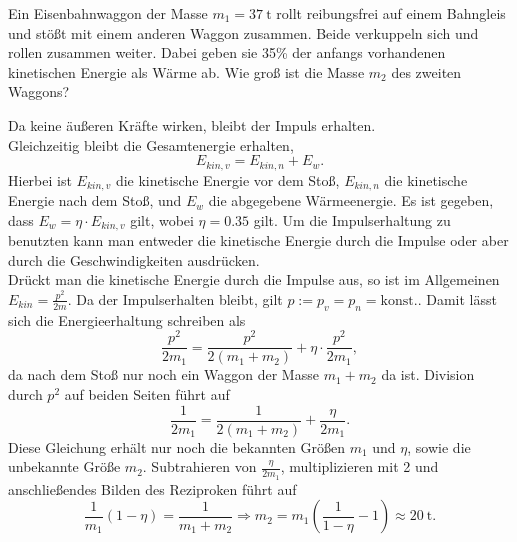 	\begin{Exercise}[label=ipho201741, title = Eisenbahnwaggon,difficulty={1},origin = {4. Runde IPhO 2017, Kurzaufgabe}]
 Ein Eisenbahnwaggon der Masse $m_1 = 37~\mathrm{t}$ rollt reibungsfrei auf einem Bahngleis und stößt mit einem anderen Waggon zusammen. Beide verkuppeln sich und rollen zusammen weiter. Dabei geben sie 35\% der anfangs vorhandenen kinetischen Energie als Wärme ab. Wie groß ist die Masse $m_2$ des zweiten Waggons?
	\end{Exercise}
\begin{Answer}[ref = ipho201741]
	Da keine äußeren Kräfte wirken, bleibt der Impuls erhalten.\\ Gleichzeitig bleibt die Gesamtenergie erhalten,
	\begin{equation}\label{energycons}
		E_{kin,v} = E_{kin,n}+E_{w}.
	\end{equation}
	Hierbei ist $E_{kin,v}$ die kinetische Energie vor dem Stoß, $E_{kin,n}$ die kinetische Energie nach dem Stoß, und $E_{w}$ die abgegebene Wärmeenergie. Es ist gegeben, dass $E_{w} = \eta \cdot E_{kin,v}$ gilt, wobei $\eta = 0.35$ gilt. Um die Impulserhaltung zu benutzten kann man entweder die kinetische Energie durch die Impulse oder aber durch die Geschwindigkeiten ausdrücken.\\
	Drückt man die kinetische Energie durch die Impulse aus, so ist im Allgemeinen $E_{kin} = \frac{p^2}{2m}$. Da der Impulserhalten bleibt, gilt $p:=p_v = p_n = \mathrm{konst.}$. Damit lässt sich die Energieerhaltung schreiben als
	\begin{equation}\label{penenergycons}
		\frac{p^2}{2m_1}= \frac{p^2}{2\left(m_1+m_2\right)} + \eta\cdot \frac{p^2}{2m_1},
	\end{equation}
	da nach dem Stoß nur noch ein \glqq Waggon\grqq{} der Masse $m_1+m_2$ da ist.
	Division durch $p^2$ auf beiden Seiten führt auf
	\begin{equation}\label{masscond}
		\frac{1}{2m_1}= \frac{1}{2\left(m_1+m_2\right)}+\frac{\eta}{2m_1}.
	\end{equation}
	Diese Gleichung erhält nur noch die bekannten Größen $m_1$ und $\eta$, sowie die unbekannte Größe $m_2$. Subtrahieren von $\frac{\eta}{2m_1}$, multiplizieren mit 2 und anschließendes Bilden des Reziproken führt auf
	\begin{equation*}\label{solp}
	\boxed{
		\frac{1}{m_1}\left(1-\eta\right) = \frac{1}{m_1+m_2} \Rightarrow m_2 = m_1\left(\frac{1}{1-\eta}-1\right)\approx 20~\mathrm{t}.}
	\end{equation*}

\end{Answer}
